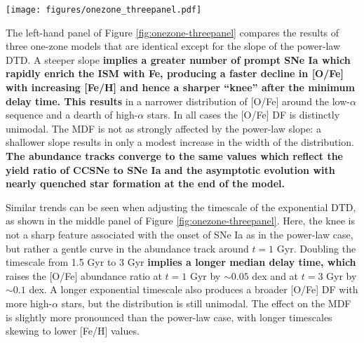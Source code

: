 \documentclass[twocolumn,twocolappendix,linenumbers]{aastex631}
\begin{document}
\begin{figure*}
    \centering
    \texttt{[image: figures/onezone\_threepanel.pdf]}
    \caption{Abundance tracks in the [O/Fe]--[Fe/H] plane for one-zone chemical evolution models (see discussion in Section \ref{sec:onezone-results}) which assume the various DTD shapes (see Figure \ref{fig:dtds}). The open symbols along each curve mark logarithmic steps in time. The top and right-hand marginal panels present the distribution functions (DFs) of [Fe/H] and [O/Fe], respectively. For display purposes, these distributions are convolved with a Gaussian kernel with a standard deviation of 0.02 dex. 
    \textit{Left:} A power-law DTD with varying slope $\alpha$. For reference, the solid gray curve represents an exponential DTD with $\tau=3$ Gyr. 
    \textit{Center:} An exponential DTD with varying timescale $\tau$. 
    \textit{Right:} A plateau DTD with varying width $W$. All assume a post-plateau slope of $\alpha=-1.1$. For reference, the solid gray curve represents an exponential DTD with $\tau=3$ Gyr, and the dotted purple curve represents a power-law DTD with $\alpha=-1.1$ and no plateau.}
    \label{fig:onezone-threepanel}
\end{figure*}

The left-hand panel of Figure \ref{fig:onezone-threepanel} compares the results of three one-zone models that are identical except for the slope of the power-law DTD. A steeper slope {\bf implies a greater number of prompt SNe Ia which rapidly enrich the ISM with Fe, producing a faster decline in [O/Fe] with increasing [Fe/H] and hence a sharper ``knee'' after the minimum delay time. This results} in a narrower distribution of [O/Fe] around the low-$\alpha$ sequence and a dearth of high-$\alpha$ stars. In all cases the [O/Fe] DF is distinctly unimodal. The MDF is not as strongly affected by the power-law slope: a shallower slope results in only a modest increase in the width of the distribution. {\bf The abundance tracks converge to the same values which reflect the yield ratio of CCSNe to SNe Ia and the asymptotic evolution with nearly quenched star formation at the end of the model.}

Similar trends can be seen when adjusting the timescale of the exponential DTD, as shown in the middle panel of Figure \ref{fig:onezone-threepanel}. Here, the knee is not a sharp feature associated with the onset of SNe Ia as in the power-law case, but rather a gentle curve in the abundance track around $t=1$ Gyr. Doubling the timescale from 1.5 Gyr to 3 Gyr {\bf implies a longer median delay time, which} raises the [O/Fe] abundance ratio at $t=1$ Gyr by $\sim0.05$ dex and at $t=3$ Gyr by $\sim0.1$ dex.
A longer exponential timescale also produces a broader [O/Fe] DF with more high-$\alpha$ stars, but the distribution is still unimodal.
The effect on the MDF is slightly more pronounced than the power-law case, with longer timescales skewing to lower [Fe/H] values.
\end{document}
